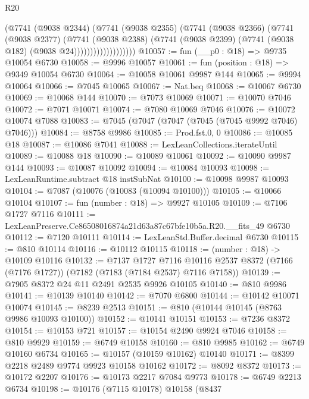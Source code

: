 \begin{lexlean}{R20}
\begin{coremodule}
{                          (@7741
                            (@9038 @2344)
                            (@7741
                              (@9038 @2355)
                              (@7741
                                (@9038 @2366)
                                (@7741
                                  (@9038 @2377)
                                  (@7741
                                    (@9038 @2388)
                                    (@7741
                                      (@9038 @2399)
                                      (@7741 (@9038 @182) (@9038 @24)))))))))))))))))))
@10057 := fun (__p0 : @18) => @9735 @10054 @6730
@10058 := @9996 @10057
@10061 := fun (position : @18) => @9349 @10054 @6730
@10064 := @10058 @10061 @9987 @144
@10065 := @9994 @10064
@10066 := @7045 @10065
@10067 := Nat.beq
@10068 := @10067 @6730
@10069 := @10068 @144
@10070 := @7073 @10069
@10071 := @10070 @7046
@10072 := @7071 @10071
@10074 := @7080 @10069 @7046
@10076 := @10072 @10074 @7088
@10083 := @7045 (@7047 (@7047 (@7045 (@7045 @9992 @7046) @7046)))
@10084 := @8758 @9986
@10085 := Prod.fst.{0, 0}
@10086 := @10085 @18
@10087 := @10086 @7041
@10088 := LexLeanCollections.iterateUntil
@10089 := @10088 @18
@10090 := @10089 @10061
@10092 := @10090 @9987 @144
@10093 := @10087 @10092
@10094 := @10084 @10093
@10098 := LexLeanRuntime.subtract @18 instSubNat
@10100 := @10098 @9987 @10093
@10104 := @7087 (@10076 (@10083 (@10094 @10100)))
@10105 := @10066 @10104
@10107 := fun (number : @18) => @9927 @10105
@10109 := @7106 @1727 @7116
@10111 := LexLeanPreserve.Ce86508016874a21d63a87c67bfe10b5a.R20.__fits_49 @6730
@10112 := @7120 @10111
@10114 := LexLeanStd.Buffer.decimal @6730
@10115 := @810 @10114
@10116 := @10112 @10115
@10118 := (number : @18) -> @10109 @10116
@10132 := @7137
    @1727
    @7116
    @10116
    @2537
    @8372
    (@7166 (@7176 @1727))
    (@7182 (@7183 (@7184 @2537) @7116 @7158))
@10139 := @7905 @8372 @24 @11 @2491 @2535 @9926 @10105
@10140 := @810 @9986
@10141 := @10139 @10140
@10142 := @7070 @6800
@10144 := @10142 @10071 @10074
@10145 := @8239 @2513
@10151 := @810 (@10144 @10145 (@8763 @9986 @10093 @10100))
@10152 := @10141 @10151
@10153 := @7236 @8372
@10154 := @10153 @721
@10157 := @10154 @2490 @9924 @7046
@10158 := @810 @9929
@10159 := @6749 @10158
@10160 := @810 @9985
@10162 := @6749 @10160 @6734
@10165 := @10157 (@10159 @10162) @10140
@10171 := @8399 @2218 @2489 @9774 @9923 @10158 @10162
@10172 := @8092 @8372
@10173 := @10172 @2207
@10176 := @10173 @2217 @7084 @9773
@10178 := @6749 @2213 @6734
@10198 := @10176
    (@7115 @10178)
    @10158
    (@8437
}
\end{coremodule}
\end{lexlean}
